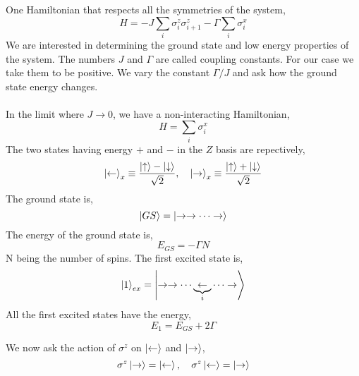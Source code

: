 \documentclass[a4paper,11pt]{article}
\newcommand{\be}{\begin{equation}}
\newcommand{\ee}{\end{equation}}
\def\s{\sigma}
\begin{document}
One Hamiltonian that respects all the symmetries of the system, 
\begin{equation*}
H = - J \sum_i \s_i^z \s_{i + 1}^z - \Gamma \sum_i \s_i^x
\end{equation*}
We are interested in determining the ground state and low energy properties of the system. The numbers $J$ and $ \Gamma $ are called coupling constants. For our case we take them to be positive. We vary the constant $\Gamma/J$  and ask how the ground state energy changes.\\ \\
 In the limit where $J \to 0$, we have a non-interacting Hamiltonian,
 \be
 H = \sum_i \s_i^x
 \ee
The two states having energy $+$ and $-$  in the $Z$ basis are repectively, 
\begin{equation*}
\ket{\leftarrow}_x \equiv \frac{\ket{\uparrow} - \ket{\downarrow}}{\sqrt{2}}, \quad 
\ket{\rightarrow}_x \equiv\frac{\ket{\uparrow} + \ket{\downarrow}}{\sqrt{2}}
\end{equation*}
The ground state is,
\be
\ket{GS} = \ket{\rightarrow \rightarrow \cdots \rightarrow}
\ee
The energy of the ground state is, 
\be
E_{GS} = - \Gamma N
\ee
N being the number of spins. The first excited state is, 
\begin{equation*}
\ket{1}_{ex} = \ket{\rightarrow \rightarrow \cdots \underbrace{\leftarrow}_{i} \cdots \rightarrow} 
\end{equation*}
All the first excited states have the energy, 
\be
E_1 = E_{GS} + 2 \Gamma
\ee


We now ask the action of $\s^z$ on $\ket{\leftarrow}$ and $\ket{\rightarrow}$,
\begin{equation*}
\s^z \ket{\rightarrow} = \ket{\leftarrow}, \quad 
\s^z \ket{\leftarrow} = \ket{\rightarrow}
\end{equation*}
\end{document}
